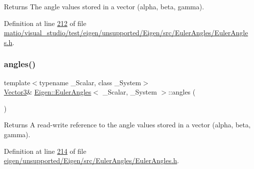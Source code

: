 \begin{DoxyReturn}{Returns}
The angle values stored in a vector (alpha, beta, gamma). 
\end{DoxyReturn}


Definition at line \hyperlink{matio_2visual__studio_2test_2eigen_2unsupported_2_eigen_2src_2_euler_angles_2_euler_angles_8h_source_l00212}{212} of file \hyperlink{matio_2visual__studio_2test_2eigen_2unsupported_2_eigen_2src_2_euler_angles_2_euler_angles_8h_source}{matio/visual\+\_\+studio/test/eigen/unsupported/\+Eigen/src/\+Euler\+Angles/\+Euler\+Angles.\+h}.

\mbox{\label{class_eigen_1_1_euler_angles_afff76daa2d6a3165a1354c349366fb80}} 
\subsubsection{\texorpdfstring{angles()}{angles()}\hspace{0.1cm}{\footnotesize\ttfamily [3/4]}}
{\footnotesize\ttfamily template$<$typename \+\_\+\+Scalar, class \+\_\+\+System$>$ \\
\hyperlink{class_eigen_1_1_euler_angles_af0f446aa0f46b3439abedff63fabf39c}{Vector3}\& \hyperlink{class_eigen_1_1_euler_angles}{Eigen\+::\+Euler\+Angles}$<$ \+\_\+\+Scalar, \+\_\+\+System $>$\+::angles (\begin{DoxyParamCaption}{ }\end{DoxyParamCaption})\hspace{0.3cm}{\ttfamily [inline]}}

\begin{DoxyReturn}{Returns}
A read-\/write reference to the angle values stored in a vector (alpha, beta, gamma). 
\end{DoxyReturn}


Definition at line \hyperlink{eigen_2unsupported_2_eigen_2src_2_euler_angles_2_euler_angles_8h_source_l00214}{214} of file \hyperlink{eigen_2unsupported_2_eigen_2src_2_euler_angles_2_euler_angles_8h_source}{eigen/unsupported/\+Eigen/src/\+Euler\+Angles/\+Euler\+Angles.\+h}.

\mbox{\label{class_eigen_1_1_euler_angles_afff76daa2d6a3165a1354c349366fb80}} 
